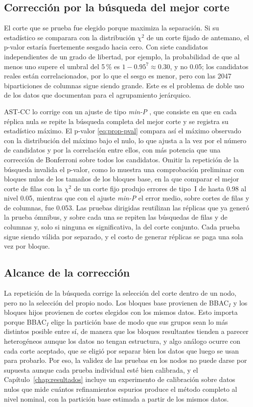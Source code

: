 \subsection{Corrección por la búsqueda del mejor corte}\label{sec:prop-minP}

El corte que se prueba fue elegido porque maximiza la separación. Si su
estadístico se comparara con la distribución $\chi^2$ de un corte fijado de
antemano, el p-valor estaría fuertemente sesgado hacia cero. Con siete candidatos
independientes de un grado de libertad, por ejemplo, la probabilidad de que al
menos uno supere el umbral del 5\,\% es $1-0.95^7\approx 0.30$, y no 0.05; los
candidatos reales están correlacionados, por lo que el sesgo es menor, pero con
las 2047 biparticiones de columnas sigue siendo grande. Este es el
problema de doble uso de los datos que documentan \citet{Gao2024} para el
agrupamiento jerárquico.

AST-CC lo corrige con un ajuste de tipo \emph{min-P} \citep{Westfall1993}, que
consiste en que en cada réplica nula se repite la búsqueda completa del mejor corte y se
registra su estadístico máximo. El p-valor \eqref{eq:prop-pval} compara así el
máximo observado con la distribución del máximo bajo el nulo, lo que ajusta a
la vez por el número de candidatos y por la correlación entre ellos, con más
potencia que una corrección de Bonferroni sobre todos los candidatos. Omitir la
repetición de la búsqueda invalida el p-valor, como lo muestra una comprobación
preliminar con bloques nulos de los tamaños de los bloques base, en la que comparar
el mejor corte de
filas con la $\chi^2$ de un corte fijo produjo errores de tipo~I de hasta 0.98
al nivel 0.05, mientras que con el ajuste \emph{min-P} el error medio, sobre
cortes de filas y de columnas, fue 0.053. Las pruebas dirigidas reutilizan las
réplicas que ya generó la prueba ómnibus, y sobre cada una se repiten las
búsquedas de filas y de columnas y, solo si ninguna es significativa, la del
corte conjunto. Cada prueba sigue siendo válida
por separado, y el costo de generar réplicas se paga una sola vez por bloque.

\subsection{Alcance de la corrección}

La repetición de la búsqueda corrige la selección del corte dentro de un nodo,
pero no la selección del propio nodo. Los bloques base provienen de BBAC$_I$ y
los bloques hijos provienen de cortes elegidos con los mismos datos. Esto importa porque BBAC$_I$ elige la partición base de modo que sus grupos sean
lo más distintos posible entre sí, de manera que los bloques resultantes tienden a
parecer heterogéneos aunque los datos no tengan estructura, y algo análogo ocurre
con cada corte aceptado, que se eligió por separar bien los datos que luego se
usan para probarlo. Por eso,
la validez de las pruebas en los nodos no puede darse por supuesta aunque cada
prueba individual esté bien calibrada, y el
Capítulo~\ref{chap:resultados} incluye un experimento de calibración sobre datos
nulos que mide cuántos refinamientos espurios produce el método completo al
nivel nominal, con la partición base estimada a partir de los mismos datos.

